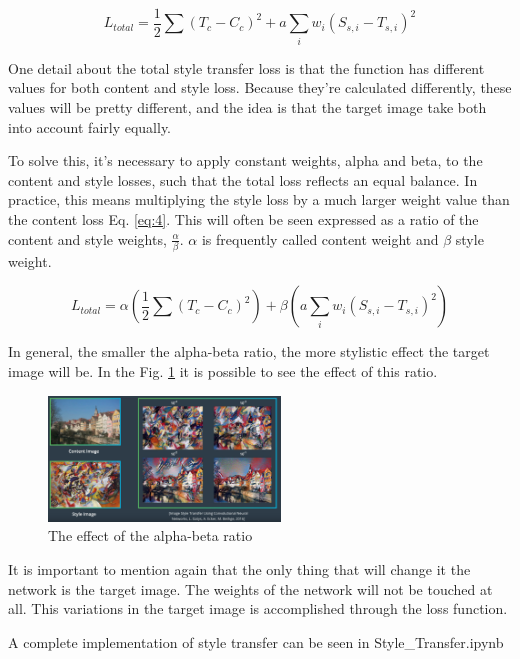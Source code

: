 \documentclass{article}
\begin{document}
\begin{equation}
L_{total} = \frac{1}{2} \sum(T_c - C_c)^2 + a \sum_i w_i (S_{s,i} - T_{s,i})^2
\label{eq:3}
\end{equation}

One detail about the total style transfer loss is that the function has different values for both content and style loss. Because they're calculated differently, these values will be pretty different, and the idea is that the target image take both into account fairly equally.

To solve this, it's necessary to apply constant weights, alpha and beta, to the content and style losses, such that the total loss reflects an equal balance. In practice, this means multiplying the style loss by a much larger weight value than the content loss Eq. \eqref{eq:4}. This will often be seen expressed as a ratio of the content and style weights, \(\frac{\alpha}{\beta}\). \(\alpha\) is frequently called content weight and \(\beta\) style weight.

\begin{equation}
L_{total} = \alpha (\frac{1}{2} \sum(T_c - C_c)^2) + \beta (a \sum_i w_i (S_{s,i} - T_{s,i})^2)
\label{eq:4}
\end{equation}

In general, the smaller the alpha-beta ratio, the more stylistic effect the target image will be. In the Fig. \ref{fig:f10} it is possible to see the effect of this ratio.

\begin{figure}[ht]
    \centering
    \includegraphics[width=0.55\textwidth,height=0.55\textheight,keepaspectratio]{images/beta.png}
    \captionsetup{justification=centering}
    \caption{The effect of the alpha-beta ratio}
    \label{fig:f10}
\end{figure}

It is important to mention again that the only thing that will change it the network is the target image. The weights of the network will not be touched at all. This variations in the target image is accomplished through the loss function.

A complete implementation of style transfer can be seen in Style\_Transfer.ipynb

\printbibliography
\end{document}
